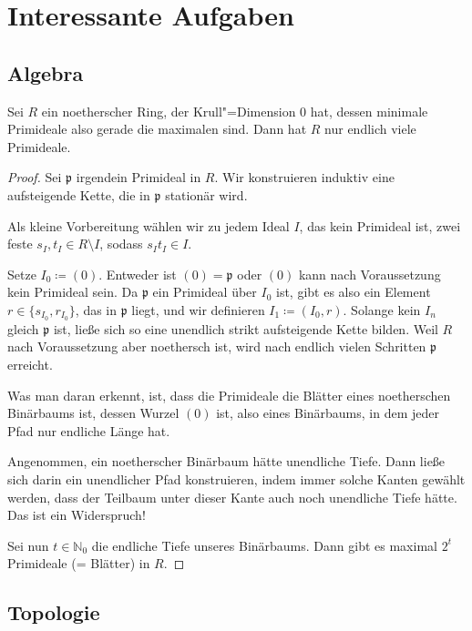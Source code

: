 \documentclass[ngerman, 11pt, a4paper, twoside, abstracton]{scrbook}
\begin{document}
\appendix

\chapter{Interessante Aufgaben}

\section{Algebra}

\begin{exercise}
  Sei $R$ ein noetherscher Ring, der Krull"=Dimension 0 hat, dessen minimale Primideale also gerade die maximalen sind. Dann hat $R$ nur endlich viele Primideale.
\end{exercise}
\begin{proof}
  Sei $\mathfrak{p}$ irgendein Primideal in $R$. Wir konstruieren induktiv eine aufsteigende Kette, die in $\mathfrak{p}$ stationär wird.

  Als kleine Vorbereitung wählen wir zu jedem Ideal $I$, das kein Primideal ist, zwei feste $s_I, t_I\in R\setminus I$, sodass $s_It_I\in I$.

  Setze $I_0 \coloneqq \left( 0 \right)$. Entweder ist $\left( 0 \right) = \mathfrak{p}$ oder $\left( 0 \right)$ kann nach Voraussetzung kein Primideal sein. Da $\mathfrak{p}$ ein Primideal über $I_0$ ist, gibt es also ein Element $r\in\{s_{I_0}, r_{I_0} \}$, das in $\mathfrak{p}$ liegt, und wir definieren $I_1\coloneqq \left( I_0, r \right)$. Solange kein $I_n$ gleich $\mathfrak{p}$ ist, ließe sich so eine unendlich strikt aufsteigende Kette bilden. Weil $R$ nach Voraussetzung aber noethersch ist, wird nach endlich vielen Schritten $\mathfrak{p}$ erreicht.

  Was man daran erkennt, ist, dass die Primideale die Blätter eines noetherschen Binärbaums ist, dessen Wurzel $\left( 0 \right)$ ist, also eines Binärbaums, in dem jeder Pfad nur endliche Länge hat.

  Angenommen, ein noetherscher Binärbaum hätte unendliche Tiefe. Dann ließe sich darin ein unendlicher Pfad konstruieren, indem immer solche Kanten gewählt werden, dass der Teilbaum unter dieser Kante auch noch unendliche Tiefe hätte. Das ist ein Widerspruch!

  Sei nun $t\in \mathbb{N}_0$ die endliche Tiefe unseres Binärbaums. Dann gibt es maximal $2^t$ Primideale (= Blätter) in $R$.
\end{proof}

\section{Topologie}
\end{document}
